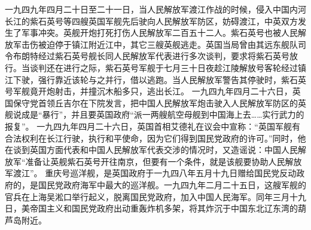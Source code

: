 \begin{maonote}
一九四九年四月二十日至二十一日，当人民解放军渡江作战的时候，侵入中国内河长江的紫石英号等四艘英国军舰先后驶向人民解放军防区，妨碍渡江，中英双方发生了军事冲突。英舰开炮打死打伤人民解放军二百五十二人。紫石英号也被人民解放军击伤被迫停于镇江附近江中，其它三艘英舰逃走。英国当局曾由其远东舰队司令布朗特经过紫石英号舰长同人民解放军代表进行多次谈判，要求将紫石英号放行。当谈判还在进行之际，紫石英号军舰于七月三十日夜趁江陵解放号客轮经过镇江下驶，强行靠近该轮与之并行，借以逃跑。当人民解放军警告其停驶时，紫石英号军舰竟开炮射击，并撞沉木船多只，逃出长江。
一九四九年四月二十六日，英国保守党首领丘吉尔在下院发言，把中国人民解放军炮击驶入人民解放军防区的英舰说成是“暴行”，并且要英国政府“派一两艘航空母舰到中国海上去……实行武力的报复”。
一九四九年四月二十六日，英国首相艾德礼在议会中宣称：“英国军舰有合法权利在长江行驶，执行和平使命，因为它们得到国民党政府的许可。”同时，他在谈到英国方面代表和中国人民解放军代表交涉的情况时，又造谣说：中国人民解放军“准备让英舰紫石英号开往南京，但要有一个条件，就是该舰要协助人民解放军渡江”。
重庆号巡洋舰，是英国政府于一九四八年五月十九日赠给国民党反动政府的，是国民党政府海军中最大的巡洋舰。一九四九年二月二十五日，这艘军舰的官兵在上海吴淞口举行起义，脱离国民党政府，加入中国人民海军。同年三月十九日，美帝国主义和国民党政府出动重轰炸机多架，将其炸沉于中国东北辽东湾的葫芦岛附近。
\end{maonote}
